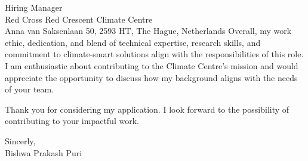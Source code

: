 \documentclass[a4paper,12pt]{letter}
\begin{document}
\begin{letter}{Hiring Manager\\Red Cross Red Crescent Climate Centre\\Anna van Saksenlaan 50, 2593 HT, The Hague, Netherlands}
Overall, my work ethic, dedication, and blend of technical expertise, research skills, and commitment to climate-smart solutions align with the responsibilities of this role. I am enthusiastic about contributing to the Climate Centre's mission and would appreciate the opportunity to discuss how my background aligns with the needs of your team.

Thank you for considering my application. I look forward to the possibility of contributing to your impactful work.

\vspace{1.3em}

Sincerly,\\
Bishwa Prakash Puri


\end{letter}
\end{document}
